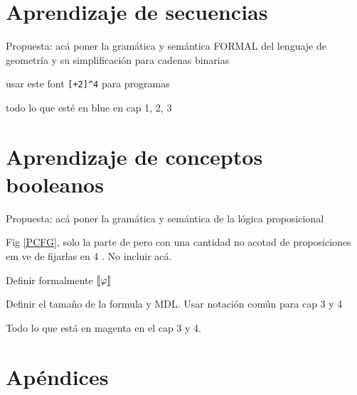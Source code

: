 \documentclass[a4paper,12pt,oneside]{book}
\begin{document}
    \part{Aprendizaje de secuencias}
    \color{blue}
    Propuesta: acá poner la gramática y semántica FORMAL del lenguaje de geometría y su simplificación para cadenas binarias

    usar este font \verb#[+2]^4# para programas

    todo lo que esté en blue en cap 1, 2, 3

    \color{black}


    
    

    \part{Aprendizaje de conceptos booleanos}
    \color{magenta}
    Propuesta: acá poner la gramática y semántica de la lógica proposicional
    
    Fig \ref{PCFG}, solo la parte de \grambool pero con una cantidad no acotad de proposiciones em ve de fijarlas en 4 . No incluir \gramboolxor acá.

    Definir formalmente $\llbracket \varphi\rrbracket$

    Definir el tamaño de la formula y MDL. Usar notación común para cap 3 y 4

    Todo lo que está en magenta en el cap 3 y 4.


    \color{black}

    
    
    
    
    \part{Apéndices}
    \appendix
    
    
    
    
    
    
\end{document}
